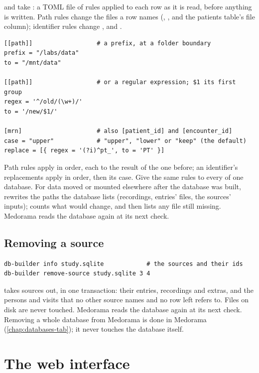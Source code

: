  and  take : a TOML file of rules applied to each
row as it is read, before anything is written. Path rules change the files a row names
(, , and the patients table's file column); identifier rules
change ,  and .
\begin{lstlisting}
[[path]]                  # a prefix, at a folder boundary
prefix = "/labs/data"
to = "/mnt/data"

[[path]]                  # or a regular expression; $1 its first group
regex = '^/old/(\w+)/'
to = '/new/$1/'

[mrn]                     # also [patient_id] and [encounter_id]
case = "upper"            # "upper", "lower" or "keep" (the default)
replace = [{ regex = '(?i)^pt_', to = 'PT' }]
\end{lstlisting}
Path rules apply in order, each to the result of the one before; an identifier's replacements
apply in order, then its case. Give the same rules to every  of one database. For data
moved or mounted elsewhere after the database was built,  rewrites the paths the database lists (recordings, entries' files, the sources' inputs);
 counts what would change, and  then lists any file still missing.
Medorama reads the database again at its next check.

\subsection{Removing a source}
\label{sec:importing-removing}

\begin{lstlisting}[style=shell]
db-builder info study.sqlite            # the sources and their ids
db-builder remove-source study.sqlite 3 4
\end{lstlisting}
 takes sources out, in one transaction: their entries, recordings and extras,
and the persons and visits that no other source names and no row left refers to. Files on disk
are never touched. Medorama reads the database again at its next check. Removing a whole
database from Medorama is done in Medorama (\cref{chap:databases-tab}); it never touches the
database itself.

\section{The web interface}
\label{sec:importing-web}

